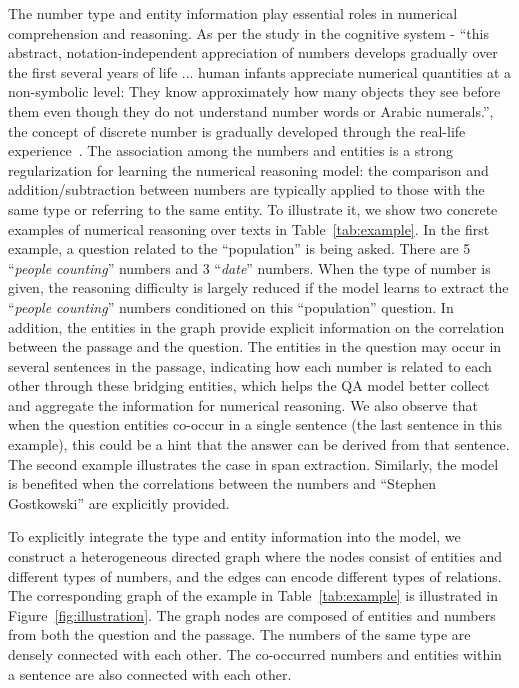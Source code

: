 \documentclass{article}
\begin{document}
The number type and entity information play essential roles in numerical comprehension and reasoning.
As per the study in the cognitive system - ``this abstract, notation-independent appreciation of numbers develops gradually over the first several years of life ... human infants appreciate numerical quantities at a non-symbolic level: They know approximately how many objects they see before them even though they do not understand number words or Arabic numerals.'', the concept of discrete number is gradually developed through the real-life experience~\cite{cantlon2009neural}.
The association among the numbers and entities is a strong regularization for learning the numerical reasoning model: the comparison and addition/subtraction between numbers are typically applied to those with the same type or referring to the same entity. 
To illustrate it, we show two concrete examples of numerical reasoning over texts in Table~\ref{tab:example}.
In the first example, a question related to the ``population'' is being asked. There are 5 ``\textit{people counting}'' numbers and 3 ``\textit{date}'' numbers.
When the type of number is given, the reasoning difficulty is largely reduced if the model learns to extract the ``\textit{people counting}'' numbers conditioned on this ``population'' question. 
In addition, the entities in the graph provide explicit information on the correlation between the passage and the question.
The entities in the question may occur in several sentences in the passage, indicating how each number is related to each other through these bridging entities, which helps the QA model better collect and aggregate the information for numerical reasoning. We also observe that when the question entities co-occur in a single sentence (the last sentence in this example), this could be a hint that the answer can be derived from that sentence.
The second example illustrates the case in span extraction.
Similarly, the model is benefited when the correlations between the numbers and ``Stephen Gostkowski'' are explicitly provided.






To explicitly integrate the type and entity information into the model, we construct a heterogeneous directed graph where the nodes consist of entities and different types of numbers, and the edges can encode different types of relations. 
The corresponding graph of the example in Table~\ref{tab:example} is illustrated in Figure~\ref{fig:illustration}.
The graph nodes are composed of entities and numbers from both the question and the passage.
The numbers of the same type are densely connected with each other. The co-occurred numbers and entities within a sentence are also connected with each other. 
\end{document}
